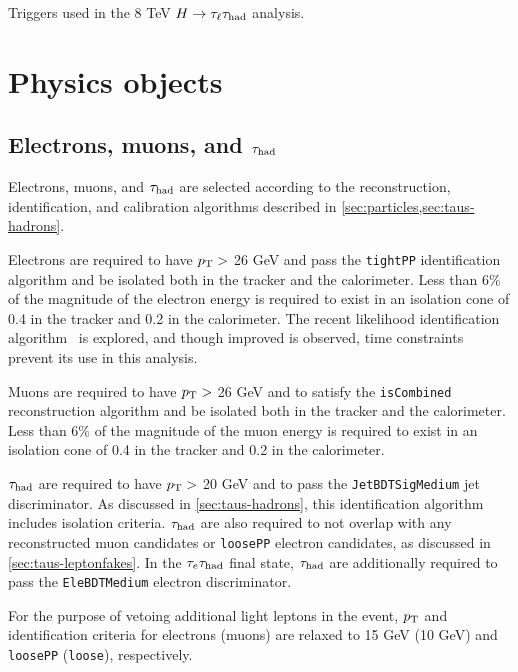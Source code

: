 \begin{table}[bp]
  \centering
  \renewcommand{\arraystretch}{1.4}
  \caption{Triggers used in the 8 TeV $H\rightarrow\tau_\ell\tau_\text{had}$ analysis.}
  
  \label{tab:strategy-triggers}
\end{table}

\section{Physics objects}
\label{sec:strategy-objects}

\subsection{Electrons, muons, and $\tau_\text{had}$}
\label{sec:strategy-leptons}

Electrons, muons, and $\tau_\text{had}$ are selected according to the reconstruction, identification, and calibration algorithms described in \cref{sec:particles,sec:taus-hadrons}.

Electrons are required to have $p_{\mathrm{T}} >$ 26 GeV and pass the \texttt{tightPP} identification algorithm and be isolated both in the tracker and the calorimeter. Less than 6\% of the magnitude of the electron energy is required to exist in an isolation cone of 0.4 in the tracker and 0.2 in the calorimeter. The recent likelihood identification algorithm~\cite{ATLAS-CONF-2014-032} is explored, and though improved is observed, time constraints prevent its use in this analysis.

Muons are required to have $p_{\mathrm{T}} >$ 26 GeV and to satisfy the \texttt{isCombined} reconstruction algorithm and be isolated both in the tracker and the calorimeter. Less than 6\% of the magnitude of the muon energy is required to exist in an isolation cone of 0.4 in the tracker and 0.2 in the calorimeter.

$\tau_\text{had}$ are required to have $p_{\mathrm{T}} >$ 20 GeV and to pass the \texttt{JetBDTSigMedium} jet discriminator. As discussed in \cref{sec:taus-hadrons}, this identification algorithm includes isolation criteria. $\tau_\text{had}$ are also required to not overlap with any reconstructed muon candidates or \texttt{loosePP} electron candidates, as discussed in \cref{sec:taus-leptonfakes}. In the $\tau_e \tau_\text{had}$ final state, $\tau_\text{had}$ are additionally required to pass the \texttt{EleBDTMedium} electron discriminator.

For the purpose of vetoing additional light leptons in the event, $p_{\mathrm{T}}$ and identification criteria for electrons (muons) are relaxed to 15 GeV (10 GeV) and \texttt{loosePP} (\texttt{loose}), respectively.

